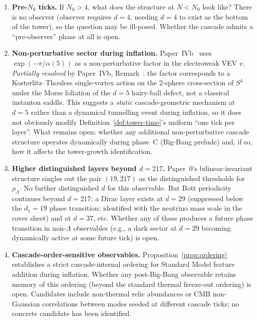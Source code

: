 \documentclass[12pt,a4paper]{article}
\begin{document}
\begin{enumerate}[leftmargin=*,nosep]
\item \textbf{Pre-$N_0$ ticks.} If $N_0 > 4$, what does the structure at
$N < N_0$ look like? There is no observer (observer requires $d = 4$, needing
$d = 4$ to exist as the bottom of the tower), so the question may be
ill-posed. Whether the cascade admits a ``pre-observer'' phase at all is
open.

\item \textbf{Non-perturbative sector during inflation.} Paper~IVb~\cite{part4b}
uses $\exp(-\pi/\alpha(5))$ as a non-perturbative factor in the electroweak
VEV $v$. \emph{Partially resolved} by Paper~IVb, Remark~: the factor
corresponds to a Kosterlitz--Thouless single-vortex action on the 2-sphere
cross-section of $S^4$ under the Morse foliation of the $d=5$ hairy-ball
defect, not a classical instanton saddle. This suggests a \emph{static}
cascade-geometric mechanism at $d=5$ rather than a dynamical tunnelling
event during inflation, so it does not obviously modify Definition~\ref{def:tower-time}'s
uniform ``one tick per layer''. What remains open: whether any additional
non-perturbative cascade structure operates dynamically during phase~C
(Big-Bang prelude) and, if so, how it affects the tower-growth identification.

\item \textbf{Higher distinguished layers beyond $d = 217$.} Paper~0's
bilinear-invariant structure singles out the pair $(19, 217)$ as the
distinguished thresholds for $\rho_\Lambda$. No further distinguished $d$ for
this observable. But Bott periodicity continues beyond $d = 217$: a Dirac
layer exists at $d = 29$ (suppressed below the $d_1 = 19$ phase transition;
identified with the neutrino mass scale in the cover sheet) and at $d = 37$,
etc. Whether any of these produces a future phase transition in non-$\Lambda$
observables (e.g., a dark sector at $d = 29$ becoming dynamically active at
some future tick) is open.

\item \textbf{Cascade-order-sensitive observables.} Proposition~\ref{prop:ordering}
establishes a strict cascade-internal ordering for Standard Model feature
addition during inflation. Whether any post-Big-Bang observable retains
memory of this ordering (beyond the standard thermal freeze-out ordering) is
open. Candidates include non-thermal relic abundances or CMB non-Gaussian
correlations between modes seeded at different cascade ticks; no concrete
candidate has been identified.

\end{enumerate}
\end{document}
